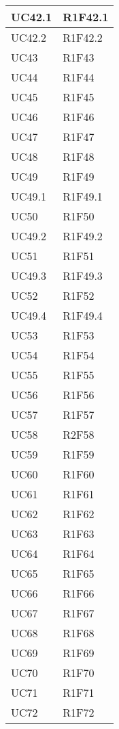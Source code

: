 \begin{center}
\begin{longtable}{|p{44mm}|p{22mm}|}
		\hline
		UC42.1 &
		R1F42.1 
		\\
		\hline
		UC42.2 &
		R1F42.2 
		\\
		\hline
		UC43 &
		R1F43 
		\\
		\hline
		UC44 &
		R1F44 
		\\
		\hline
		UC45 &
		R1F45 
		\\
		\hline
		UC46 &
		R1F46 
		\\
		\hline
		UC47 &
		R1F47 
		\\
		\hline
		UC48 &
		R1F48 
		\\
		\hline
		UC49 &
		R1F49 
		\\
		\hline
		UC49.1 &
		R1F49.1 
		\\
		\hline
		UC50 &
		R1F50 
		\\
		\hline
		UC49.2 &
		R1F49.2 
		\\
		\hline
		UC51 &
		R1F51 
		\\
		\hline
		UC49.3 &
		R1F49.3 
		\\
		\hline
		UC52 &
		R1F52 
		\\
		\hline
		UC49.4 &
		R1F49.4 
		\\
		\hline
		UC53 &
		R1F53 
		\\
		\hline
		UC54 &
		R1F54 
		\\
		\hline
		UC55 &
		R1F55 
		\\
		\hline
		UC56 &
		R1F56 
		\\
		\hline
		UC57 &
		R1F57 
		\\
		\hline
		UC58 &
		R2F58 
		\\
		\hline
		UC59 &
		R1F59 
		\\
		\hline
		UC60 &
		R1F60 
		\\
		\hline
		UC61 &
		R1F61 
		\\
		\hline
		UC62 &
		R1F62 
		\\
		\hline
		UC63 &
		R1F63 
		\\
		\hline
		UC64 &
		R1F64 
		\\
		\hline
		UC65 &
		R1F65 
		\\
		\hline
		UC66 &
		R1F66 
		\\
		\hline
		UC67 &
		R1F67 
		\\
		\hline
		UC68 &
		R1F68 
		\\
		\hline
		UC69 &
		R1F69 
		\\
		\hline
		UC70 &
		R1F70 
		\\
		\hline
		UC71 &
		R1F71 
		\\
		\hline
		UC72 &
		R1F72 
		\\
		\hline%
		
	\end{longtable}
\end{center}

